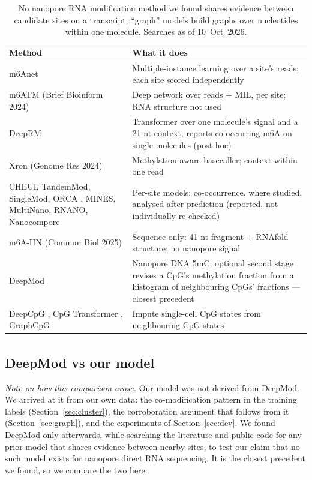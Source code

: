 \documentclass[11pt,a4paper]{article}
\makeatletter
\newcounter{appmarknum}
\DeclareRobustCommand{\appmark}[1]{%
    \refstepcounter{appmarknum}\label{appmark@#1}%
    \textsuperscript{\arabic{appmarknum}}}
\makeatother
\begin{document}
\begin{table}[H]
    \centering\small
    \begin{tabularx}{\linewidth}{>{\raggedright\arraybackslash}p{4.6cm}Y}
        \toprule
        \textbf{Method} & \textbf{What it does} \\
        \midrule
        m6Anet \citep{hendra2022} & Multiple-instance learning over a site's reads; each site scored independently \\
        m6ATM (Brief Bioinform 2024) & Deep network over reads + MIL, per site; RNA structure not used \\
        DeepRM \citep{kang2025} & Transformer over one molecule's signal and a 21-nt context; reports co-occurring m6A on single molecules (post hoc) \\
        Xron (Genome Res 2024) & Methylation-aware basecaller; context within one read \\
        CHEUI, TandemMod, SingleMod, ORCA \citep{orca2026}, MINES, MultiNano, RNANO, Nanocompore \citep{leger2021} & Per-site models; co-occurrence, where studied, analysed after prediction (reported, not individually re-checked) \\
        m6A-IIN (Commun Biol 2025) & Sequence-only: 41-nt fragment + RNAfold structure; no nanopore signal \\
        DeepMod \citep{liu2019deepmod} & Nanopore DNA 5mC; optional second stage revises a CpG's methylation fraction from a histogram of neighbouring CpGs' fractions --- closest precedent \\
        DeepCpG \citep{angermueller2017}, CpG Transformer \citep{dewaele2022}, GraphCpG & Impute single-cell CpG states from neighbouring CpG states \\
        \bottomrule
    \end{tabularx}
    \caption{No nanopore RNA modification method we found shares evidence
    between candidate sites on a transcript; ``graph'' models build graphs
    over nucleotides within one molecule. Searches as of 10~Oct~2026.}
    \label{tab:related}
\end{table}

\subsection*{DeepMod vs our model\texorpdfstring{\appmark{app:deepmod}}{}}
\label{app:deepmod}
\textit{Note on how this comparison arose.} Our model was not derived from
DeepMod. We arrived at it from our own data: the co-modification pattern in
the training labels (Section~\ref{sec:cluster}), the corroboration argument
that follows from it (Section~\ref{sec:graph}), and the experiments of
Section~\ref{sec:dev}. We found DeepMod only afterwards, while searching the
literature and public code for any prior model that shares evidence between
nearby sites, to test our claim that no such model exists for nanopore direct
RNA sequencing. It is the closest precedent we found, so we compare the two
here.
\end{document}
